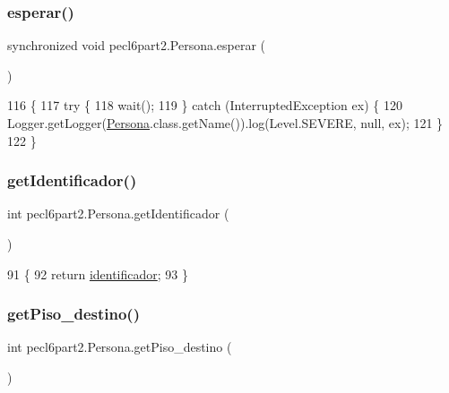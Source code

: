 \subsubsection{\texorpdfstring{esperar()}{esperar()}}
{\footnotesize\ttfamily synchronized void pecl6part2.\+Persona.\+esperar (\begin{DoxyParamCaption}{ }\end{DoxyParamCaption})\hspace{0.3cm}{\ttfamily [inline]}}


\begin{DoxyCode}
116     \{
117         \textcolor{keywordflow}{try} \{
118             wait();
119         \} \textcolor{keywordflow}{catch} (InterruptedException ex) \{
120             Logger.getLogger(\mbox{\hyperlink{classpecl6part1_1_1_persona}{Persona}}.class.getName()).log(Level.SEVERE, null, ex);
121         \}
122     \}
\end{DoxyCode}
\mbox{\label{classpecl6part2_1_1_persona_aa3e90842881a71eae3b5c1b542cf41bc}} 
\subsubsection{\texorpdfstring{get\+Identificador()}{getIdentificador()}}
{\footnotesize\ttfamily int pecl6part2.\+Persona.\+get\+Identificador (\begin{DoxyParamCaption}{ }\end{DoxyParamCaption})\hspace{0.3cm}{\ttfamily [inline]}}


\begin{DoxyCode}
91                                   \{
92         \textcolor{keywordflow}{return} \mbox{\hyperlink{classpecl6part2_1_1_persona_a8b7b7d11bc23cac7514d1e3c20267589}{identificador}};
93     \}
\end{DoxyCode}
\mbox{\label{classpecl6part2_1_1_persona_a01b814c668271969c7990f9e5470a8ed}} 
\subsubsection{\texorpdfstring{get\+Piso\+\_\+destino()}{getPiso\_destino()}}
{\footnotesize\ttfamily int pecl6part2.\+Persona.\+get\+Piso\+\_\+destino (\begin{DoxyParamCaption}{ }\end{DoxyParamCaption})\hspace{0.3cm}{\ttfamily [inline]}}


